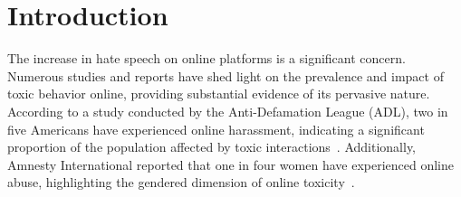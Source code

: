 \section{Introduction}

The increase in hate speech on online platforms is a significant concern.
Numerous studies and reports have shed light on the prevalence and impact of toxic behavior online, providing substantial evidence of its pervasive nature.
According to a study conducted by the Anti-Defamation League (ADL), two in five Americans have experienced online harassment, indicating a significant proportion of the population affected by toxic interactions~\cite{adl2017online}.
Additionally, Amnesty International reported that one in four women have experienced online abuse, highlighting the gendered dimension of online toxicity~\cite{amnesty2018toxictwitter}. 

